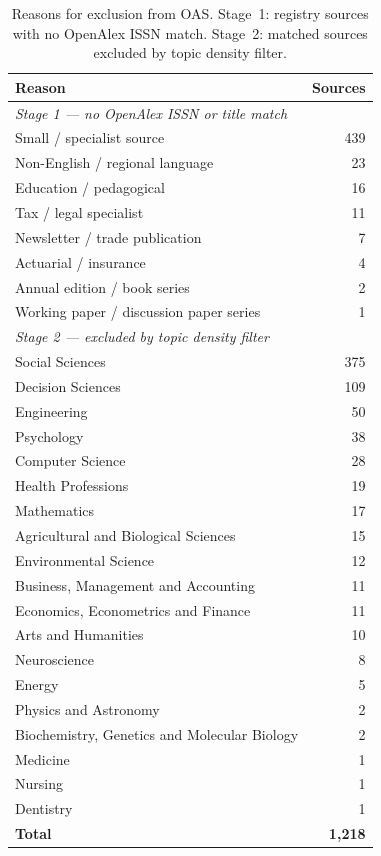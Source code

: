 \begin{table}[htbp]
\centering
\caption{Reasons for exclusion from OAS. Stage~1: registry sources with no OpenAlex ISSN match. Stage~2: matched sources excluded by topic density filter.}
\label{tab:oas_exclusions}
\begin{tabular}{lr}
\toprule
\textbf{Reason} & \textbf{Sources} \\
\midrule
\multicolumn{2}{l}{\textit{Stage 1 — no OpenAlex ISSN or title match}} \\
\quad Small / specialist source & 439 \\
\quad Non-English / regional language & 23 \\
\quad Education / pedagogical & 16 \\
\quad Tax / legal specialist & 11 \\
\quad Newsletter / trade publication & 7 \\
\quad Actuarial / insurance & 4 \\
\quad Annual edition / book series & 2 \\
\quad Working paper / discussion paper series & 1 \\
\midrule
\multicolumn{2}{l}{\textit{Stage 2 — excluded by topic density filter}} \\
\quad Social Sciences & 375 \\
\quad Decision Sciences & 109 \\
\quad Engineering & 50 \\
\quad Psychology & 38 \\
\quad Computer Science & 28 \\
\quad Health Professions & 19 \\
\quad Mathematics & 17 \\
\quad Agricultural and Biological Sciences & 15 \\
\quad Environmental Science & 12 \\
\quad Business, Management and Accounting & 11 \\
\quad Economics, Econometrics and Finance & 11 \\
\quad Arts and Humanities & 10 \\
\quad Neuroscience & 8 \\
\quad Energy & 5 \\
\quad Physics and Astronomy & 2 \\
\quad Biochemistry, Genetics and Molecular Biology & 2 \\
\quad Medicine & 1 \\
\quad Nursing & 1 \\
\quad Dentistry & 1 \\
\midrule
\textbf{Total} & \textbf{1,218} \\
\bottomrule
\end{tabular}
\end{table}
